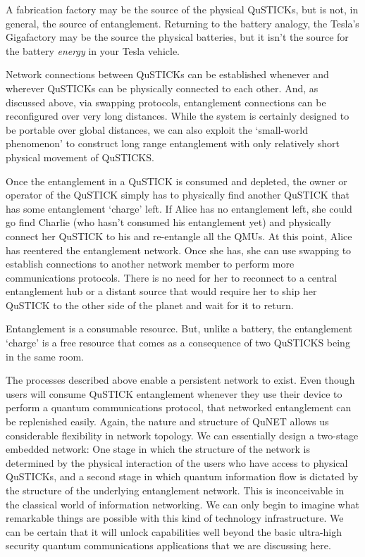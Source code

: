 \documentclass[twocolumn, aps, rmp, amsmath, amssymb, nofootinbib, superscriptaddress, longbibliography, floatfix, table-of-contents, eqsecnum]{revtex4-2}
\begin{document}
A fabrication factory may be the source of the physical QuSTICKs, but is not, in general, the source of entanglement. Returning to the battery analogy, the Tesla's Gigafactory may be the source the physical batteries, but it isn't the source for the battery \textit{energy} in your Tesla vehicle. 

Network connections between QuSTICKs can be established whenever and wherever QuSTICKs can be physically connected to each other. And, as discussed above, via swapping protocols, entanglement connections can be reconfigured over very long distances. While the system is certainly designed to be portable over global distances, we can also exploit the `small-world phenomenon' to construct long range entanglement with only relatively short physical movement of QuSTICKS. 

Once the entanglement in a QuSTICK is consumed and depleted, the owner or operator of the QuSTICK simply has to physically find another QuSTICK that has some entanglement `charge' left. If Alice has no entanglement left, she could go find Charlie (who hasn't consumed his entanglement yet) and physically connect her QuSTICK to his and re-entangle all the QMUs. At this point, Alice has reentered the entanglement network. Once she has, she can use swapping to establish connections to another network member to perform more communications protocols. There is no need for her to reconnect to a central entanglement hub or a distant source that would require her to ship her QuSTICK to the other side of the planet and wait for it to return. 

Entanglement is a consumable resource. But, unlike a battery, the entanglement `charge' is a free resource that comes as a consequence of two QuSTICKS being in the same room. 

The processes described above enable a persistent network to exist. Even though users will consume QuSTICK entanglement whenever they use their device to perform a quantum communications protocol, that networked entanglement can be replenished easily. Again, the nature and structure of QuNET allows us considerable flexibility in network topology. We can essentially design a two-stage embedded network: One stage in which the structure of the network is determined by the physical interaction of the users who have access to physical QuSTICKs, and a second stage in which quantum information flow is dictated by the structure of the underlying entanglement network. This is inconceivable in the classical world of information networking. We can only begin to imagine what remarkable things are possible with this kind of technology infrastructure. We can be certain that it will unlock capabilities well beyond the basic ultra-high security quantum communications applications that we are discussing here. 
\end{document}
